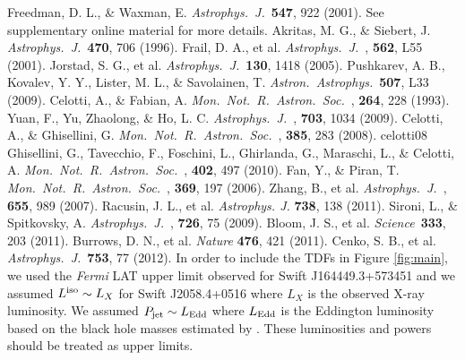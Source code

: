\documentclass[12pt]{article}
\def\aap{{\it Astron.~Astrophys.}~}
\def\apj{{\it Astrophys.~J.}~}
\def\mnras{{\it Mon.~Not.~R.~Astron.~Soc.}~}
\def\sci{{\it Science}~}
\begin{document}
\begin{thebibliography}{1}
 Freedman, D. L., \& Waxman, E. \apj \textbf{547}, 922 (2001).	
 See supplementary online material for more details. 
 Akritas, M. G., \& Siebert, J.  \apj \textbf{470}, 706 (1996).	
 Frail, D. A., et al. \apj, {\bf 562}, L55 (2001).	
 Jorstad, S. G., et al. \apj 	\textbf{130}, 1418 (2005).	
 Pushkarev, A. B., Kovalev, Y. Y., Lister, M. L., \& Savolainen, T. \aap 	\textbf{507}, L33 (2009).	
 Celotti, A., \& Fabian, A. \mnras, {\bf 264}, 228 (1993).	
 Yuan, F., Yu, Zhaolong, \& Ho, L. C. \apj, {\bf 703}, 1034 (2009).	
 Celotti, A., \& Ghisellini, G. \mnras, {\bf 385}, 283 (2008).	
celotti08
 Ghisellini, G., Tavecchio, F., Foschini, L., Ghirlanda, G., Maraschi, L., \& Celotti, A. \mnras, {\bf 402}, 497 (2010).	
 Fan, Y., \& Piran, T. \mnras, {\bf 369}, 197 (2006).	
 Zhang, B., et al. \apj, {\bf 655}, 989 (2007).	
 Racusin, J. L., et al.  \emph{Astrophys. J.} \textbf{738}, 138 (2011).	
 Sironi, L., \& Spitkovsky, A. \apj, {\bf 726}, 75 (2009).	
 Bloom, J. S., et al.  \sci 	\textbf{333}, 203 (2011).	
 Burrows, D. N., et al.  \emph{Nature} 	\textbf{476}, 421 (2011).	
 Cenko, S. B., et al.  \apj  {\bf 753}, 77 (2012).	
 In order to include the TDFs in Figure \ref{fig:main}, we used the \emph{Fermi} LAT upper limit \cite{burrows11} observed for Swift J164449.3+573451 and we assumed $L^{\rm iso} \sim L_X$ for Swift J2058.4+0516 \cite{cenko12} where $L_X$ is the observed X-ray luminosity. We assumed $P_{\rm jet} \sim L_{\rm Edd}$ where $L_{\rm Edd}$ is the Eddington luminosity based on the black hole masses estimated by . These luminosities and powers should be treated as upper limits. 	


\end{thebibliography}
\end{document}
